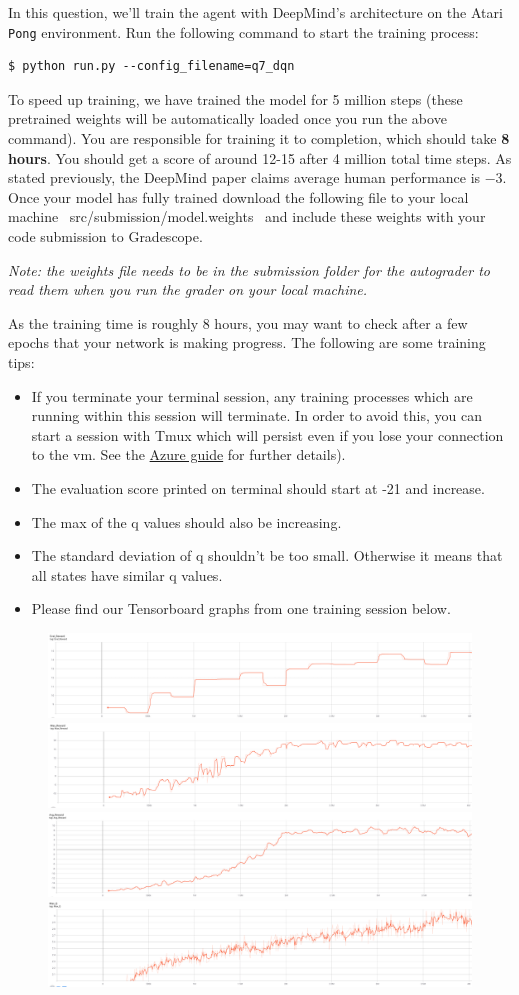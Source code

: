 \item {}

In this question, we'll train the agent with DeepMind's architecture on the Atari \texttt{Pong} environment. Run the following command to start the training process:
\begin{lstlisting}
$ python run.py --config_filename=q7_dqn
\end{lstlisting}
To speed up training, we have trained the model for 5 million steps (these pretrained weights will be automatically loaded once you run the above command). You are responsible for training it to completion, which should take \textbf{8 hours}. You should get a score of around 12-15 after 4 million total time steps.  As stated previously, the DeepMind paper claims average human performance is $ -3 $. Once your model has fully trained download the following file to your local machine ~src/submission/model.weights~ and include these weights with your code submission to Gradescope. 

\textit{Note: the weights file needs to be in the submission folder for the autograder to read them when you run the grader on your local machine.}


As the training time is roughly 8 hours, you may want to check after a few epochs that your network is making progress.  The following are some training tips:

\begin{itemize}
\item If you terminate your terminal session, any training processes which are running within this session will terminate.  In order to avoid this, you can start a session with Tmux which will persist even if you lose your connection to the vm. See the \href{https://github.com/scpd-proed/XCS234-Handouts/blob/main/Azure/Azure%20Guide.pdf}{Azure guide} for further details).
\item The evaluation score printed on terminal should start at -21 and increase.
\item The max of the q values should also be increasing.
\item The standard deviation of q shouldn't be too small. Otherwise it means that all states have similar q values.
\item Please find our Tensorboard graphs from one training session below.
\end{itemize}

\begin{figure}[H]
\centering
  \includegraphics[width=.4\linewidth]{images/Eval_R.png}
  \includegraphics[width=.4\linewidth]{images/Max_R.png}
  \includegraphics[width=.4\linewidth]{images/Avg_R.png}
  \includegraphics[width=.4\linewidth]{images/Max_Q.png}
\end{figure}